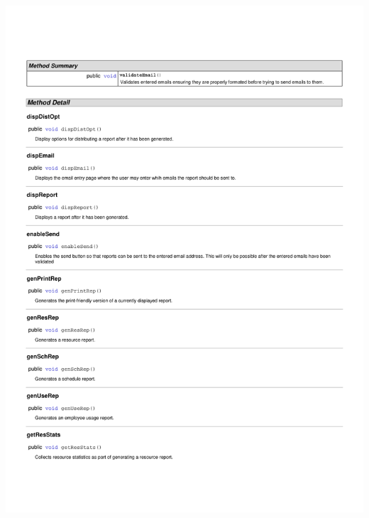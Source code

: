 \documentclass[letterpaper,12pt]{report}
\begin{document}
\includegraphics[scale=0.9,trim=20mm 30mm 25mm 25mm]{externals/InterfaceDataDictionary6.pdf}
\newpage
\end{document}
